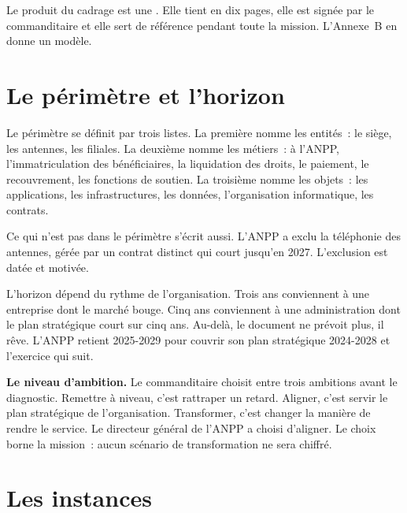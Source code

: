 Le produit du cadrage est une . Elle tient en dix pages, elle est signée par le
commanditaire et elle sert de référence pendant toute la mission. L'Annexe~B en donne un modèle.

\section{Le périmètre et l'horizon}
\label{sec:c08-perimetre}

Le périmètre se définit par trois listes. La première nomme les entités~: le siège, les antennes, les filiales.
La deuxième nomme les métiers~: à l'ANPP, l'immatriculation des bénéficiaires, la liquidation des droits, le
paiement, le recouvrement, les fonctions de soutien. La troisième nomme les objets~: les applications, les
infrastructures, les données, l'organisation informatique, les contrats.

Ce qui n'est pas dans le périmètre s'écrit aussi. L'ANPP a exclu la téléphonie des antennes, gérée par un
contrat distinct qui court jusqu'en 2027. L'exclusion est datée et motivée.

L'horizon dépend du rythme de l'organisation. Trois ans conviennent à une entreprise dont le marché bouge.
Cinq ans conviennent à une administration dont le plan stratégique court sur cinq ans. Au-delà, le document ne
prévoit plus, il rêve. L'ANPP retient 2025-2029 pour couvrir son plan stratégique 2024-2028 et l'exercice qui
suit.

\begin{boxinfo}
\textbf{Le niveau d'ambition.} Le commanditaire choisit entre trois ambitions avant le diagnostic. Remettre à
niveau, c'est rattraper un retard. Aligner, c'est servir le plan stratégique de l'organisation. Transformer,
c'est changer la manière de rendre le service. Le directeur général de l'ANPP a choisi d'aligner. Le choix
borne la mission~: aucun scénario de transformation ne sera chiffré.
\end{boxinfo}

\section{Les instances}
\label{sec:c08-instances}


